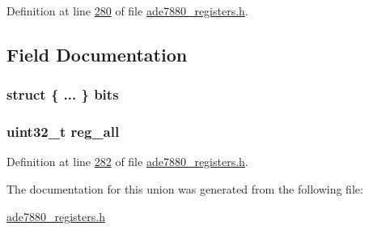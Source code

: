 Definition at line \hyperlink{a00036_source_l00280}{280} of file \hyperlink{a00036_source}{ade7880\-\_\-registers.\-h}.



\subsection{Field Documentation}
\hypertarget{a00027_af8d64437b498ddbfcbc4d131ebad25c3}{
\subsubsection[{bits}]{\setlength{\rightskip}{0pt plus 5cm}struct \{ ... \}  bits}}\label{d0/d33/a00027_af8d64437b498ddbfcbc4d131ebad25c3}
\hypertarget{a00027_ae44a0232a79ff51b5ef7aa80e4b35470}{
\subsubsection[{reg\-\_\-all}]{\setlength{\rightskip}{0pt plus 5cm}uint32\-\_\-t reg\-\_\-all}}\label{d0/d33/a00027_ae44a0232a79ff51b5ef7aa80e4b35470}


Definition at line \hyperlink{a00036_source_l00282}{282} of file \hyperlink{a00036_source}{ade7880\-\_\-registers.\-h}.



The documentation for this union was generated from the following file\-:\begin{DoxyCompactItemize}
\item 
\hyperlink{a00036}{ade7880\-\_\-registers.\-h}\end{DoxyCompactItemize}
